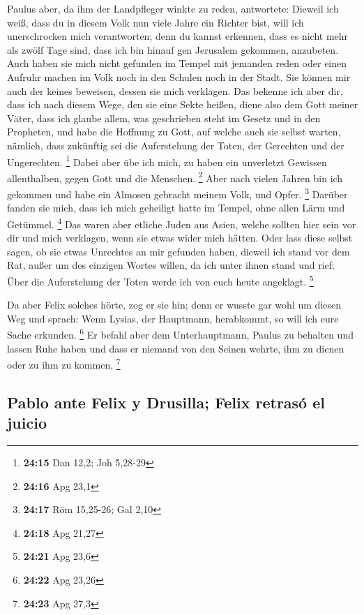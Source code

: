 Paulus aber, da ihm der Landpfleger winkte zu reden,
antwortete: Dieweil ich weiß, dass du in diesem Volk nun viele Jahre ein
Richter bist, will ich unerschrocken mich verantworten; 
denn du kannst erkennen, dass es nicht mehr als zwölf Tage sind, dass
ich bin hinauf gen Jerusalem gekommen, anzubeten.  Auch
haben sie mich nicht gefunden im Tempel mit jemanden reden oder einen
Aufruhr machen im Volk noch in den Schulen noch in der Stadt.
 Sie können mir auch der keines beweisen, dessen sie mich
verklagen.  Das bekenne ich aber dir, dass ich nach
diesem Wege, den sie eine Sekte heißen, diene also dem Gott meiner
Väter, dass ich glaube allem, was geschrieben steht im Gesetz und in den
Propheten,  und habe die Hoffnung zu Gott, auf welche
auch sie selbst warten, nämlich, dass zukünftig sei die Auferstehung der
Toten, der Gerechten und der Ungerechten. \footnote{\textbf{24:15} Dan
  12,2; Joh 5,28-29}  Dabei aber übe ich mich, zu haben
ein unverletzt Gewissen allenthalben, gegen Gott und die Menschen.
\footnote{\textbf{24:16} Apg 23,1}  Aber nach vielen
Jahren bin ich gekommen und habe ein Almosen gebracht meinem Volk, und
Opfer. \footnote{\textbf{24:17} Röm 15,25-26; Gal 2,10} 
Darüber fanden sie mich, dass ich mich geheiligt hatte im Tempel, ohne
allen Lärm und Getümmel. \footnote{\textbf{24:18} Apg 21,27}
 Das waren aber etliche Juden aus Asien, welche sollten
hier sein vor dir und mich verklagen, wenn sie etwas wider mich hätten.
 Oder lass diese selbst sagen, ob sie etwas Unrechtes an
mir gefunden haben, dieweil ich stand vor dem Rat,  außer
um des einzigen Wortes willen, da ich unter ihnen stand und rief: Über
die Auferstehung der Toten werde ich von euch heute angeklagt.
\footnote{\textbf{24:21} Apg 23,6}

 Da aber Felix solches hörte, zog er sie hin; denn er
wusste gar wohl um diesen Weg und sprach: Wenn Lysias, der Hauptmann,
herabkommt, so will ich eure Sache erkunden. \footnote{\textbf{24:22}
  Apg 23,26}  Er befahl aber dem Unterhauptmann, Paulus
zu behalten und lassen Ruhe haben und dass er niemand von den Seinen
wehrte, ihm zu dienen oder zu ihm zu kommen. \footnote{\textbf{24:23}
  Apg 27,3}

\hypertarget{pablo-ante-felix-y-drusilla-felix-retrasuxf3-el-juicio}{%
\subsection{Pablo ante Felix y Drusilla; Felix retrasó el
juicio}\label{pablo-ante-felix-y-drusilla-felix-retrasuxf3-el-juicio}}

